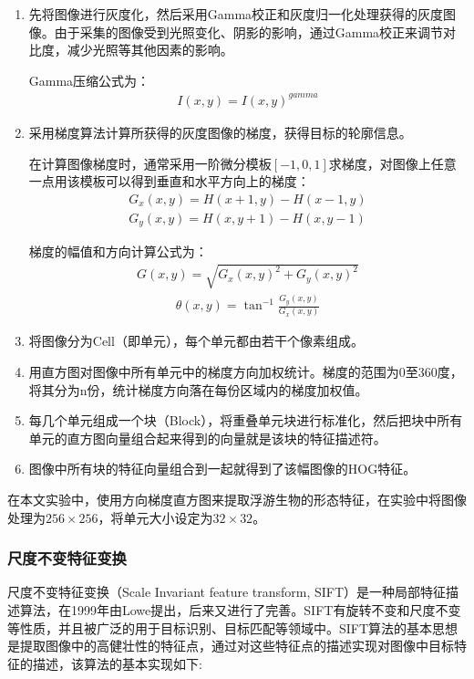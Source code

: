 \begin{enumerate}
\item 先将图像进行灰度化，然后采用Gamma校正和灰度归一化处理获得的灰度图像。由于采集的图像受到光照变化、阴影的影响，通过Gamma校正来调节对比度，减少光照等其他因素的影响。

  Gamma压缩公式为：
  \begin{eqnarray}
  I(x,y) = I(x,y)^{gamma}
  \end{eqnarray}
\item 采用梯度算法计算所获得的灰度图像的梯度，获得目标的轮廓信息。

  在计算图像梯度时，通常采用一阶微分模板$[-1,0,1]$求梯度，对图像上任意一点用该模板可以得到垂直和水平方向上的梯度：
  \begin{eqnarray}
  G_{x}(x,y)=H(x+1,y)-H(x-1,y)\\
  G_{y}(x,y)=H(x,y+1)-H(x,y-1)
  \end{eqnarray}

  梯度的幅值和方向计算公式为：
  \begin{eqnarray}
  G(x,y)=\sqrt{G_{x}(x,y)^{2}+G_{y}(x,y)^2}
  \end{eqnarray}
  \begin{eqnarray}
  \theta(x,y)=\tan^{-1}\frac{G_{y}(x,y)}{G_{x}(x,y)}
  \end{eqnarray}

\item 将图像分为Cell（即单元），每个单元都由若干个像素组成。%
\item 用直方图对图像中所有单元中的梯度方向加权统计。梯度的范围为0至360度，将其分为n份，统计梯度方向落在每份区域内的梯度加权值。
\item 每几个单元组成一个块（Block），将重叠单元块进行标准化，然后把块中所有单元的直方图向量组合起来得到的向量就是该块的特征描述符。
\item 图像中所有块的特征向量组合到一起就得到了该幅图像的HOG特征。
\end{enumerate}

在本文实验中，使用方向梯度直方图来提取浮游生物的形态特征，在实验中将图像处理为$256 \times 256$，将单元大小设定为$32 \times 32$。

\subsubsection{尺度不变特征变换}

尺度不变特征变换（Scale Invariant feature transform, SIFT）是一种局部特征描述算法，在1999年由Lowe提出\cite{lowe1999object}，后来又进行了完善。SIFT有旋转不变和尺度不变等性质，并且被广泛的用于目标识别、目标匹配等领域中。SIFT算法的基本思想是提取图像中的高健壮性的特征点，通过对这些特征点的描述实现对图像中目标特征的描述，该算法的基本实现如下:

